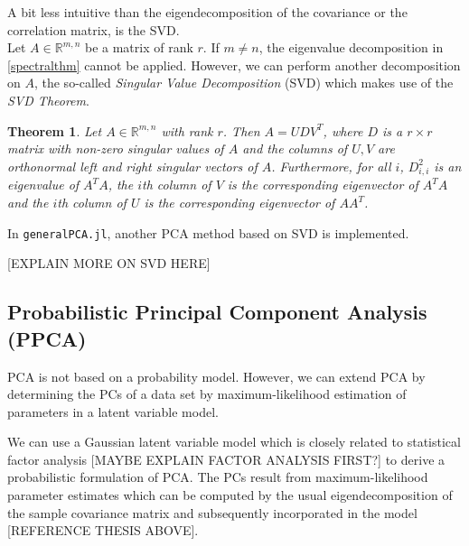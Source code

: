 \documentclass[journal, a4paper]{IEEEtran}
\newtheorem{theorem}{Theorem}[section]
\begin{document}
A bit less intuitive than the eigendecomposition of the covariance or the correlation matrix, is the SVD.\\
Let \( A \in \mathbb{R}^{m,n} \) be a matrix of rank \( r \). If \( m \neq n\), the eigenvalue decomposition in \ref{spectralthm} cannot be applied. However, we can perform another decomposition on \( A \), the so-called \textit{Singular Value Decomposition} (SVD) which makes use of the \textit{SVD Theorem}.
\begin{theorem}\label{svdthm}
	Let \( A \in \mathbb{R}^{m,n} \) with rank \( r \). Then \( A = UDV^T\), where \( D \) is a \( r \times r \) matrix with non-zero singular values of \( A \) and the columns of \( U, V \) are orthonormal left and right singular vectors of \( A \). Furthermore, for all \( i \), \( D_{i,i}^{2} \) is an eigenvalue of \( A^T A\), the \( i \)th column of \( V \) is the corresponding eigenvector of \( A^T A\) and the \( i \)th column of \( U \) is the corresponding eigenvector of \( A A^T\).
\end{theorem}

In \texttt{generalPCA.jl}, another PCA method based on SVD is implemented.



[EXPLAIN MORE ON SVD HERE]


\subsection{Probabilistic Principal Component Analysis (PPCA)}

PCA is not based on a probability model. However, we can extend PCA by determining the PCs of a data set by maximum-likelihood estimation of parameters in a latent variable model.

We can use a Gaussian latent variable model which is closely related to statistical factor analysis  [MAYBE EXPLAIN FACTOR ANALYSIS FIRST?] to derive a probabilistic formulation of PCA. The PCs result from maximum-likelihood parameter estimates which can be computed by the usual eigendecomposition of the sample covariance matrix and subsequently incorporated in the model [REFERENCE THESIS ABOVE]. 

\end{document}

